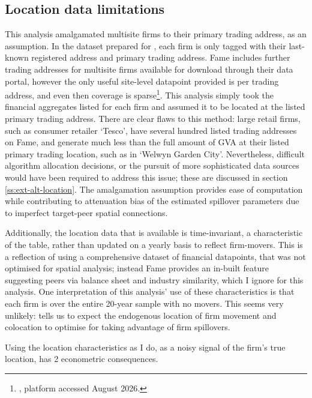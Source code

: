 \subsection{Location data limitations}
\label{ss:data-location-limits}

This analysis amalgamated multisite firms to their primary trading address, as an assumption.
In the dataset prepared for \cite{Irastorza-Fadrique2026},
each firm is only tagged with their last-known registered address and primary trading address.
Fame includes further trading addresses for multisite firms available for download through their data portal,
however the only useful site-level datapoint provided is  per trading address,
and even then coverage is sparse\footnote{\cite{MoodysAnalytics2026}, platform accessed August 2026.}.
This analysis simply took the financial aggregates listed for each firm
and assumed it to be located at the listed primary trading address.
There are clear flaws to this method: large retail firms, such as consumer retailer `Tesco',
have several hundred listed trading addresses on Fame,
and generate much less than the full amount of GVA
at their listed primary trading location, such as in `Welwyn Garden City'.
Nevertheless, difficult algorithm allocation decisions,
or the pursuit of more sophisticated data sources
would have been required to address this issue;
these are discussed in section \ref{ss:ext-alt-location}.
The amalgamation assumption provides ease of computation 
while contributing to attenuation bias of the estimated spillover parameters
due to imperfect target-peer spatial connections.
\par
Additionally, the location data that is available is time-invariant,
a characteristic of the  table, rather than updated on a yearly basis
to reflect firm-movers.
This is a reflection of using a comprehensive dataset of financial datapoints,
that was not optimised for spatial analysis; instead Fame provides an in-built feature
suggesting peers via balance sheet and industry similarity, which I ignore for this analysis.
One interpretation of this analysis' use of these characteristics
is that each firm is over the entire 20-year sample with no movers.
This seems very unlikely:  tells us to expect
the endogenous location of firm movement and colocation
to optimise for taking advantage of firm spillovers.
\par
Using the location characteristics as I do,
as a noisy signal of the firm's true location, has 2 econometric consequences.
